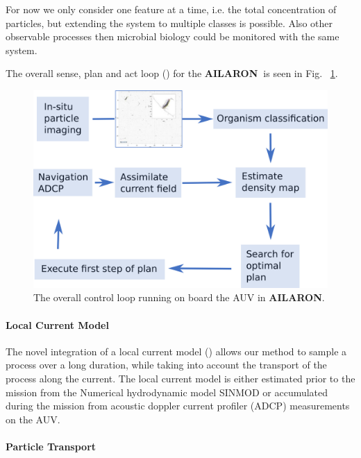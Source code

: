 \documentclass[conference]{IEEEtran}
\def\proj{{\textbf{AILARON\ }}}
\def\proje{{\textbf{AILARON}}}
\newcommand{\cmt}[1]{{\color{red}{#1}}}
\begin{document}
For now we only consider one feature at a time, i.e. the total
concentration of particles, but extending the system to multiple
classes is possible.  Also other observable processes then microbial
biology could be monitored with the same system.

The overall sense, plan and act loop (\cmt{This is abrupt. Most
  readers without an AI background won't know what the sense-plan-act
  loop is. Plus you should cite prior work there}) for the \proj is
seen in Fig. ~\ref{fig:sensePlanActLoop}. \cmt{This a very different notion
  of SPA, but its good!}

\begin{figure}[tbp]
\centerline{\includegraphics[width=0.9\linewidth]{figures/workflow-simplified.png}}
\caption{The overall control loop running on board the AUV in
  \proje.\cmt{I would remote 'optimal' and also 'Execute first..'
    since the planner works continuously, not incrementally}}
\label{fig:sensePlanActLoop}
\end{figure}

\paragraph{Local Current Model}

The novel integration of a local current model (\cmt{what is a
  currrent model? Describe and cite}) allows our method to sample a
process over a long duration, while taking into account the transport
of the process along the current.  The local current model is either
estimated prior to the mission from the Numerical hydrodynamic model
SINMOD or accumulated during the mission from acoustic doppler current
profiler (ADCP) measurements on the AUV.

\paragraph{Particle Transport}
\end{document}
